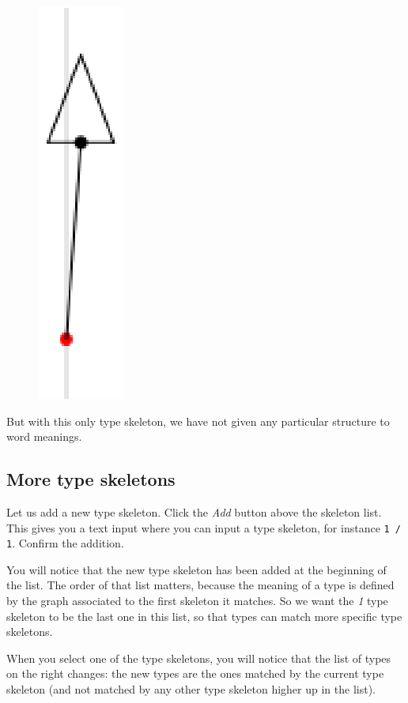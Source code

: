 \documentclass[a4paper]{article}
\begin{document}
\begin{figure}[H]
\centering
\includegraphics[scale=0.6]{figures/triangle.eps}
\end{figure}

But with this only type skeleton, we have not given any particular structure to word
meanings.

\subsection{More type skeletons}

Let us add a new type skeleton. Click the \emph{Add} button above the skeleton list.
This gives you a text input where you can input a type skeleton, for instance \texttt{1 / 1}.
Confirm the addition.

You will notice that the new type skeleton has been added at the beginning of the list.
The order of that list matters, because the meaning of a type is defined by the
graph associated to the first skeleton it matches. So we want the \emph{1} type skeleton
to be the last one in this list, so that types can match more specific type skeletons.

When you select one of the type skeletons, you will notice that the list of types on
the right changes: the new types are the ones matched by the current type skeleton
(and not matched by any other type skeleton higher up in the list).
\end{document}
